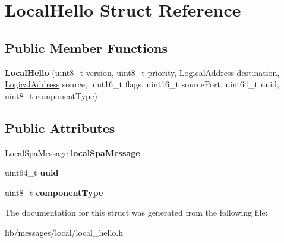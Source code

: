\hypertarget{structLocalHello}{}\section{Local\+Hello Struct Reference}
\label{structLocalHello}
\subsection*{Public Member Functions}
\begin{DoxyCompactItemize}
\item 
\mbox{\label{structLocalHello_a2ea0d07ccd8786604938da56efaa3144}} 
{\bfseries Local\+Hello} (uint8\+\_\+t version, uint8\+\_\+t priority, \hyperlink{structLogicalAddress}{Logical\+Address} destination, \hyperlink{structLogicalAddress}{Logical\+Address} source, uint16\+\_\+t flags, uint16\+\_\+t source\+Port, uint64\+\_\+t uuid, uint8\+\_\+t component\+Type)
\end{DoxyCompactItemize}
\subsection*{Public Attributes}
\begin{DoxyCompactItemize}
\item 
\mbox{\label{structLocalHello_a89f32f528654b416a69c06083fa2c326}} 
\hyperlink{structLocalSpaMessage}{Local\+Spa\+Message} {\bfseries local\+Spa\+Message}
\item 
\mbox{\label{structLocalHello_a2793976cc1bea077237bb17c2dbb1713}} 
uint64\+\_\+t {\bfseries uuid}
\item 
\mbox{\label{structLocalHello_a1814191cf0ab5e8b281ff3d3f2b455cc}} 
uint8\+\_\+t {\bfseries component\+Type}
\end{DoxyCompactItemize}


The documentation for this struct was generated from the following file\+:\begin{DoxyCompactItemize}
\item 
lib/messages/local/local\+\_\+hello.\+h\end{DoxyCompactItemize}
